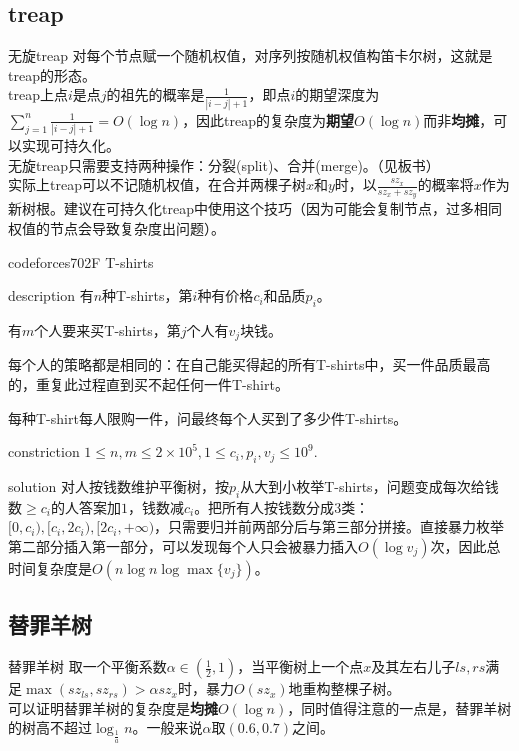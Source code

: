 \documentclass{beamer}
\begin{document}
	\subsection{treap}
	\begin{frame}{无旋treap}
		对每个节点赋一个随机权值，对序列按随机权值构笛卡尔树，这就是treap的形态。\\
		
		treap上点$i$是点$j$的祖先的概率是$\frac{1}{|i-j|+1}$，即点$i$的期望深度为$\sum_{j=1}^n\frac{1}{|i-j|+1}=O(\log n)$，因此treap的复杂度为\textbf{期望}$O(\log n)$而非\textbf{均摊}，可以实现可持久化。\\
		
		无旋treap只需要支持两种操作：分裂(split)、合并(merge)。（见板书）\\
		
		实际上treap可以不记随机权值，在合并两棵子树$x$和$y$时，以$\frac{sz_x}{sz_x+sz_y}$的概率将$x$作为新树根。建议在可持久化treap中使用这个技巧（因为可能会复制节点，过多相同权值的节点会导致复杂度出问题）。
	\end{frame}
	\begin{frame}{codeforces702F T-shirts}
		\begin{block}{description}
			有$n$种T-shirts，第$i$种有价格$c_i$和品质$p_i$。
			
			有$m$个人要来买T-shirts，第$j$个人有$v_j$块钱。
			
			每个人的策略都是相同的：在自己能买得起的所有T-shirts中，买一件品质最高的，重复此过程直到买不起任何一件T-shirt。
			
			每种T-shirt每人限购一件，问最终每个人买到了多少件T-shirts。
		\end{block}
		\begin{block}{constriction}
			$ 1\le n, m \le 2\times 10^5, 1 \le c_i, p_i, v_j \le 10^9.$
		\end{block}
		\pause
		\begin{block}{solution}
			对人按钱数维护平衡树，按$p_i$从大到小枚举T-shirts，问题变成每次给钱数$\ge c_i$的人答案加$1$，钱数减$c_i$。把所有人按钱数分成$3$类：$[0,c_i),[c_i,2c_i),[2c_i,+\infty)$，只需要归并前两部分后与第三部分拼接。直接暴力枚举第二部分插入第一部分，可以发现每个人只会被暴力插入$O(\log v_j)$次，因此总时间复杂度是$O(n\log n\log \max\{v_j\})$。
		\end{block}
	\end{frame}
	\subsection{替罪羊树}
	\begin{frame}{替罪羊树}
		取一个平衡系数$\alpha \in(\frac 12,1)$，当平衡树上一个点$x$及其左右儿子$ls,rs$满足$\max(sz_{ls},sz_{rs}) > \alpha sz_x$时，暴力$O(sz_x)$地重构整棵子树。\\
		
		可以证明替罪羊树的复杂度是\textbf{均摊}$O(\log n)$，同时值得注意的一点是，替罪羊树的树高不超过$\log_{\frac{1}{a}}n$。一般来说$\alpha$取$(0.6,0.7)$之间。
		
	\end{frame}
\end{document}
